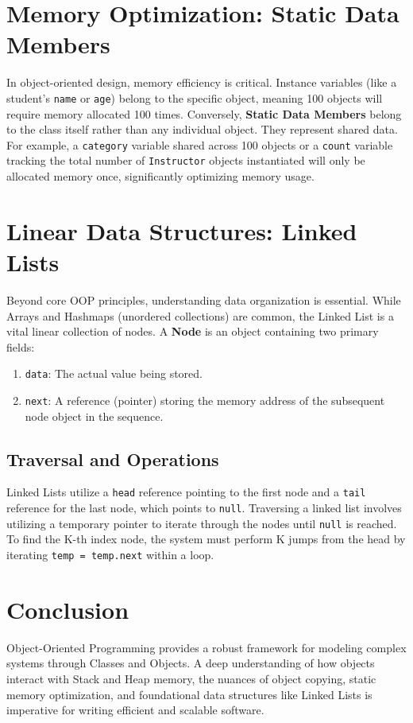 \documentclass[10pt,journal,compsoc]{IEEEtran}
\begin{document}
\section{Memory Optimization: Static Data Members}
In object-oriented design, memory efficiency is critical. Instance variables (like a student's \texttt{name} or \texttt{age}) belong to the specific object, meaning 100 objects will require memory allocated 100 times.
Conversely, \textbf{Static Data Members} belong to the class itself rather than any individual object. They represent shared data. For example, a \texttt{category} variable shared across 100 objects or a \texttt{count} variable tracking the total number of \texttt{Instructor} objects instantiated will only be allocated memory once, significantly optimizing memory usage.

\section{Linear Data Structures: Linked Lists}
Beyond core OOP principles, understanding data organization is essential. While Arrays and Hashmaps (unordered collections) are common, the Linked List is a vital linear collection of nodes.
A \textbf{Node} is an object containing two primary fields:
\begin{enumerate}
\item \texttt{data}: The actual value being stored.
\item \texttt{next}: A reference (pointer) storing the memory address of the subsequent node object in the sequence.
\end{enumerate}

\subsection{Traversal and Operations}
Linked Lists utilize a \texttt{head} reference pointing to the first node and a \texttt{tail} reference for the last node, which points to \texttt{null}.
Traversing a linked list involves utilizing a temporary pointer to iterate through the nodes until \texttt{null} is reached. To find the K-th index node, the system must perform K jumps from the head by iterating \texttt{temp = temp.next} within a loop.

\section{Conclusion}
Object-Oriented Programming provides a robust framework for modeling complex systems through Classes and Objects. A deep understanding of how objects interact with Stack and Heap memory, the nuances of object copying, static memory optimization, and foundational data structures like Linked Lists is imperative for writing efficient and scalable software.
\end{document}
